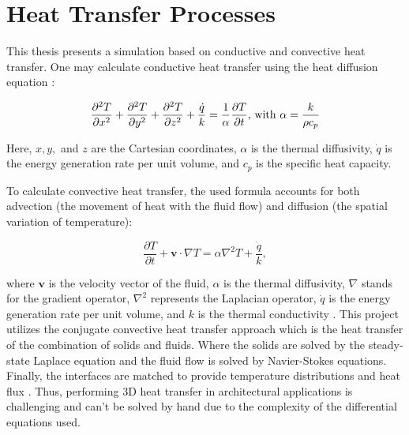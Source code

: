\section{Heat Transfer Processes}


This thesis presents a simulation based on conductive and convective heat transfer. 
One may calculate conductive heat transfer using the heat diffusion equation \cite{bergman2011fundamentals}:
	
	\begin{equation} 
	\frac{\partial^2 T}{\partial x^2}+
	\frac{\partial^2 T}{\partial y^2}+
	\frac{\partial^2 T}{\partial z^2}+ 
	\frac{\dot{q}}{k}= \frac{1}{\alpha}\frac{\partial T}{\partial t} \text{, with } \alpha = \frac{k}{\rho c_p}\quad \\
	\end{equation}
	
	
Here, $x,y,$ and $z$ are the Cartesian coordinates, $\alpha$ is the thermal diffusivity, $\dot{q}$ is the energy generation rate per unit volume, and $c_p$ is the specific heat capacity.
 
To calculate convective heat transfer, the used formula accounts for both advection (the movement of heat with the fluid flow) and diffusion (the spatial variation of temperature): 

\begin{equation}
    \frac{\partial T}{\partial t} + \mathbf{v} \cdot \nabla T = \alpha \nabla^2 T + \frac{\dot{q}}{k},
\end{equation}

where $\mathbf{v}$ is the velocity vector of the fluid, $\alpha$ is the thermal diffusivity, $\nabla$ stands for the gradient operator, $\nabla^2$ represents the Laplacian operator, $\dot{q}$ is the energy generation rate per unit volume, and $k$ is the thermal conductivity \cite{bergman2011fundamentals}. This project utilizes the conjugate convective heat transfer approach which is the heat transfer of the combination of solids and fluids. Where the solids are solved by the steady-state Laplace equation and the fluid flow is solved by Navier-Stokes equations. Finally, the interfaces are matched to provide temperature distributions and heat flux \cite{Zhao2007}. Thus, performing 3D heat transfer in architectural applications is challenging and can't be solved by hand due to the complexity of the differential equations used.



